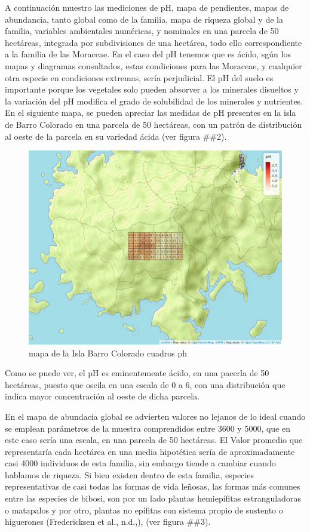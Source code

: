 \documentclass[11pt,]{article}
\begin{document}
A continuación muestro las mediciones de pH, mapa de pendientes, mapas
de abundancia, tanto global como de la familia, mapa de riqueza global y
de la familia, variables ambientales numéricas, y nominales en una
parcela de 50 hectáreas, integrada por subdivisiones de una hectárea,
todo ello correspondiente a la familia de las Moraceae. En el caso del
pH tenemos que es ácido, sgún los mapas y diagramas consultados, estas
condiciones para las Moraceae, y cualquier otra especie en condiciones
extremas, sería perjudicial. El pH del suelo es importante porque los
vegetales solo pueden absorver a los minerales disueltos y la variación
del pH modifica el grado de solubilidad de los minerales y nutrientes.
En el siguiente mapa, se pueden apreciar las medidas de pH presentes en
la isla de Barro Colorado en una parcela de 50 hectáreas, con un patrón
de distribución al oeste de la parcela en su variedad ácida (ver figura
\#\#2).

\begin{figure}
\centering
\includegraphics[width=1.00000\textwidth]{mapa_cuadros_ph.png}
\caption{mapa de la Isla Barro Colorado cuadros ph\label{fig:bci_map}}
\end{figure}

Como se puede ver, el pH es eminentemente ácido, en una pacerla de 50
hectáreas, puesto que oscila en una escala de 0 a 6, con una
distribución que indica mayor concentración al oeste de dicha parcela.

En el mapa de abundacia global se advierten valores no lejanos de lo
ideal cuando se emplean parámetros de la muestra comprendidos entre 3600
y 5000, que en este caso sería una escala, en una parcela de 50
hectáreas. El Valor promedio que representaría cada hectárea en una
media hipotética sería de aproximadamente casi 4000 individuos de esta
familia, sin embargo tiende a cambiar cuando hablamos de riqueza. Si
bien existen dentro de esta familia, especies representativas de casi
todas las formas de vida leñosas, las formas más comunes entre las
especies de bibosi, son por un lado plantas hemiepífitas estranguladoras
o matapalos y por otro, plantas no epífitas con sistema propio de
sustento o higuerones (Fredericksen et al., n.d.,), (ver figura \#\#3).
\end{document}
